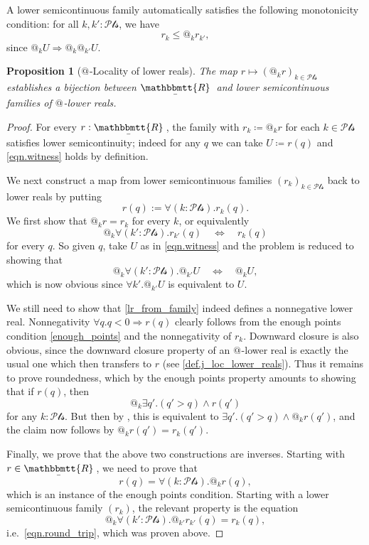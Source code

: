 \documentclass[11pt, oneside, article]{memoir}
\makeatletter
\theoremstyle{plain}
\newtheorem{proposition}[theorem]{Proposition}
\theoremstyle{definition}
\theoremstyle{remark}
\newcommand{\ubar}[1]{\underaccent{\bar}{#1}}
\newcommand{\internal}[1]{\raisebox{-.03ex}{$\mathbbmtt{#1}$}}
\newcommand{\hs}{\hspace{1.1pt}}
\newcommand{\trr}{\internal{R}\hs}
\newcommand{\tlrr}{\ubar{\trr}\hs}
\newcommand{\pt}{k}				%
\newcommand{\Pts}{\mathcal{Pts}}		%
\newcommand{\AtSymbol}{{@}}
\newcommand{\At}[1][\pt]{\AtSymbol_{#1}}
\newcommand{\imp}{\Rightarrow}
\makeatother
\begin{document}
A lower semicontinuous family automatically satisfies the following monotonicity condition: for all $\pt,\pt' : \Pts$, we have
\begin{equation}
	\label{r_pt_monotone}
	r_\pt \le \At r_{\pt'},
\end{equation}
since $\At U \imp \At \At[\pt'] U$.

\begin{proposition}[{$\At[]$-Locality of lower reals}]
	\label{prop:LR_locality}
	The map $r \mapsto (\At r)_{k\in\Pts}$ establishes a bijection between $\tlrr$ and lower semicontinuous families of $\At[]$-lower reals.
\end{proposition}

\begin{proof}
	For every $r : \tlrr$, the family with $r_\pt\coloneqq \At r$ for each $k\in\Pts$ satisfies lower semicontinuity; indeed for any $q$ we can take $U\coloneqq r(q)$ and \eqref{eqn.witness} holds by definition.

	We next construct a map from lower semicontinuous families $(r_\pt)_{\pt\in\Pts}$ back to lower reals by putting
	\begin{equation}
		\label{lr_from_family}
		r(q) := \forall (\pt : \Pts) . r_\pt(q).
	\end{equation}
	We first show that $\At r = r_\pt$ for every $\pt$, or equivalently
	\[
		\At \forall (\pt':\Pts) . r_{\pt'}(q) \quad \Longleftrightarrow \quad r_\pt(q)
	\]
	for every $q$. So given $q$, take $U$ as in \eqref{eqn.witness} and the problem is reduced to showing that
	\begin{equation}\label{eqn.round_trip}
		\At \forall (\pt':\Pts) . \At[\pt'] U \quad \Longleftrightarrow \quad \At U,
	\end{equation}
	which is now obvious since $\forall \pt' . \At[\pt'] U$ is equivalent to $U$.

	We still need to show that \eqref{lr_from_family} indeed defines a nonnegative lower real. Nonnegativity $\forall q. q<0\imp r(q)$ clearly follows from the enough points condition \cref{enough_points} and the nonnegativity of $r_\pt$. Downward closure is also obvious, since the downward closure property of an $\At[]$-lower real is exactly the usual one which then transfers to $r$ (see \cref{def.j_loc_lower_reals}). Thus it remains to prove roundedness, which by the enough points property amounts to showing that if $r(q)$, then 
	\[
		\At \exists q'. (q' > q) \wedge r(q')
	\]
	for any $\pt : \Pts$. But then by , this is equivalent to $\exists q'. (q' > q)\wedge \At r(q')$, and the claim now follows by $\At r(q') = r_\pt(q')$.

	Finally, we prove that the above two constructions are inverses. Starting with $r \in \tlrr$, we need to prove that
	\[
		r(q) = \forall (\pt : \Pts) . \At r(q),
	\]
	which is an instance of the enough points condition. Starting with a lower semicontinuous family $(r_\pt)$, the relevant property is the equation
	\[
		\At \forall (\pt' : \Pts) . \At[\pt'] r_{\pt'}(q) = r_\pt(q),
	\]
	i.e.\ \eqref{eqn.round_trip}, which was proven above.
\end{proof}
\end{document}
